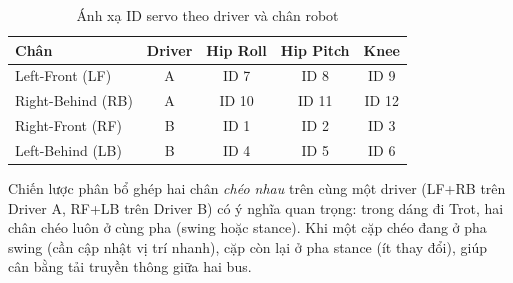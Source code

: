 \begin{table}[H]
\centering
\caption{Ánh xạ ID servo theo driver và chân robot}
\label{tab:servo_mapping}
\renewcommand{\arraystretch}{1.3}
\begin{tabular}{|l|c|c|c|c|}
\hline
\textbf{Chân} & \textbf{Driver} & \textbf{Hip Roll} & \textbf{Hip Pitch} & \textbf{Knee} \\ \hline
Left-Front (LF) & A & ID 7 & ID 8 & ID 9 \\ \hline
Right-Behind (RB) & A & ID 10 & ID 11 & ID 12 \\ \hline
Right-Front (RF) & B & ID 1 & ID 2 & ID 3 \\ \hline
Left-Behind (LB) & B & ID 4 & ID 5 & ID 6 \\ \hline
\end{tabular}
\end{table}

Chiến lược phân bổ ghép hai chân \textit{chéo nhau} trên cùng một driver (LF+RB trên Driver A, RF+LB trên Driver B) có ý nghĩa quan trọng: trong dáng đi Trot, hai chân chéo luôn ở cùng pha (swing hoặc stance). Khi một cặp chéo đang ở pha swing (cần cập nhật vị trí nhanh), cặp còn lại ở pha stance (ít thay đổi), giúp cân bằng tải truyền thông giữa hai bus.

